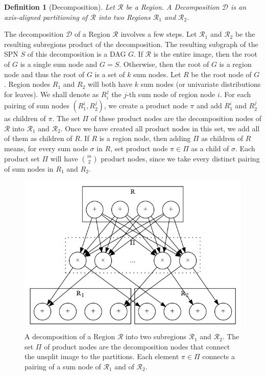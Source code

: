 \documentclass{amsart}
\newcommand{\region}{\mathcal}
\theoremstyle{plain}
\newcounter{dummy-def}\numberwithin{dummy-def}{section}
\newtheorem{definition}[dummy-def]{Definition}
\newcounter{dummy-thm}\numberwithin{dummy-thm}{section}
\newcounter{dummy-prop}\numberwithin{dummy-prop}{section}
\newcounter{dummy-corollary}\numberwithin{dummy-corollary}{section}
\newcounter{dummy-lemma}\numberwithin{dummy-lemma}{section}
\newcounter{dummy-ex}\numberwithin{dummy-ex}{section}
\newcounter{dummy-eg}\numberwithin{dummy-eg}{section}
\numberwithin{equation}{section}
\begin{document}
\begin{definition}[Decomposition]
  Let $\region{R}$ be a Region. A Decomposition $\mathcal{D}$ is an axis-aligned partitioning of
  $\region{R}$ into two Regions $\region{R}_1$ and $\region{R}_2$.
\end{definition}

The decomposition $\mathcal{D}$ of a Region $\region{R}$ involves a few steps. Let $\region{R}_1$
and $\region{R}_2$ be the resulting subregions product of the decomposition. The resulting subgraph
of the SPN $S$ of this decomposition is a DAG $G$. If $\region{R}$ is the entire image, then the
root of $G$ is a single sum node and $G=S$. Otherwise, then the root of $G$ is a region node and
thus the root of $G$ is a set of $k$ sum nodes. Let $R$ be the root node of $G$. Region nodes $R_1$
and $R_2$ will both have $k$ sum nodes (or univariate distributions for leaves). We shall denote as
$R_i^j$ the $j$-th sum node of region node $i$. For each pairing of sum nodes $(R_1^i, R_2^j)$, we
create a product node $\pi$ and add $R_1^i$ and $R_2^j$ as children of $\pi$. The set $\Pi$ of
these product nodes are the decomposition nodes of $\region{R}$ into $\region{R}_1$ and
$\region{R}_2$.  Once we have created all product nodes in this set, we add all of them as children
of $R$. If $R$ is a region node, then adding $\Pi$ as children of $R$ means, for every sum node
$\sigma$ in $R$, set product node $\pi\in\Pi$ as a child of $\sigma$. Each product set $\Pi$ will
have $\binom{m}{2}$ product nodes, since we take every distinct pairing of sum nodes in $R_1$ and
$R_2$.

\begin{figure}[h]
  \centering\includegraphics[scale=0.4]{graphs/decomp.png}
  \caption{A decomposition of a Region $\region{R}$ into two subregions $\region{R}_1$ and
  $\region{R}_2$. The set $\Pi$ of product nodes are the decomposition nodes that connect the
  unsplit image to the partitions. Each element $\pi\in\Pi$ connects a pairing of a sum node of
  $\region{R}_1$ and of $\region{R}_2$.\label{fig:decomp}}
\end{figure}
\end{document}
